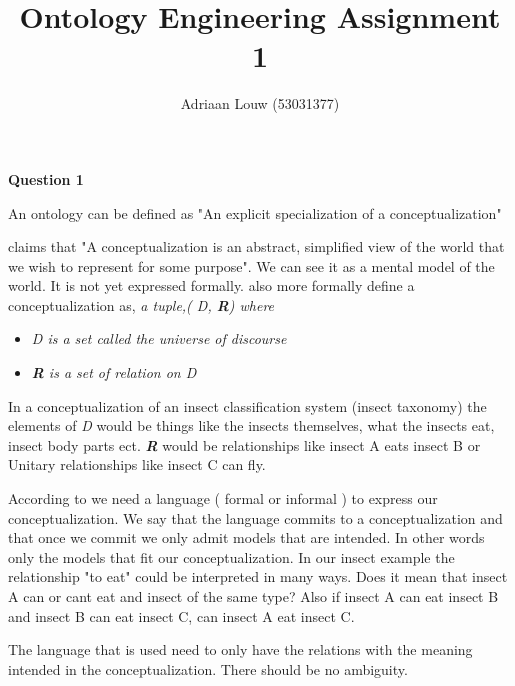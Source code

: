 \documentclass[12pt,a4paper]{article}
\title{Ontology Engineering Assignment 1}
\author{Adriaan Louw (53031377)}
\begin{document}
\maketitle

\textbf{Question 1}
\newline

An ontology can be defined as "An explicit specialization of a conceptualization" \cite{Gruber1993}

\cite{Genesereth1987} claims that "A conceptualization is an abstract, simplified view of the world that we wish to represent for some purpose". We can see it as a mental model of the world. It is not yet expressed formally. \cite{Genesereth1987} also more formally define a conceptualization as, \emph{a tuple,( D, \textbf{R}) where}
\begin{itemize}
\item \emph{D is a set called the universe of discourse }
\item \emph{\textbf{R} is a set of relation on D}
\end{itemize}

In a conceptualization of an insect classification system (insect taxonomy) the elements of \emph{D} would be things like the insects themselves, what the insects eat, insect body parts ect. \emph{\textbf{R}} would be relationships like insect A eats insect B or Unitary relationships like insect C can fly.

According to \cite{GuObSt09} we need a language ( formal or informal ) to express our conceptualization. We say that the language commits to a conceptualization and that once we commit we only admit models that are intended\citep[p.8]{GuObSt09}. In other words only the models that fit our conceptualization. In our insect example the relationship "to eat" could be interpreted in many ways. Does it mean that insect A can or cant eat and insect of the same type? Also if insect A can eat insect B and insect B can eat insect C, can insect A eat insect C.

The language that is used need to only have the relations with the meaning intended in the conceptualization. There should be no ambiguity. 
\end{document}
